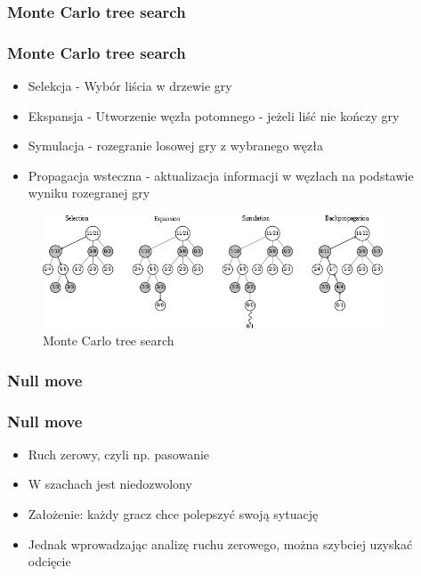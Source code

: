\documentclass[polish,envcountsect,10pt]{beamer}
\begin{document}
            \subsubsection{Monte Carlo tree search}
                \begin{frame}
                    \frametitle{Monte Carlo tree search}
                    \begin{itemize}
                        \item<1-> Selekcja - Wybór liścia w drzewie gry
                        \item<2-> Ekspansja - Utworzenie węzła potomnego - jeżeli liść nie kończy gry
                        \item<3-> Symulacja - rozegranie losowej gry z wybranego węzła
                        \item<4-> Propagacja wsteczna - aktualizacja informacji w węzłach na podstawie wyniku rozegranej gry                         
                    \end{itemize}
                    
                    \begin{figure}[H]
                        \centering
                        \includegraphics[width=0.9\textwidth]{images/mcts}
                        \caption{Monte Carlo tree search}
                    \end{figure}
                    
                \end{frame}
            \subsubsection{Null move}
            \begin{frame}
                \frametitle{Null move}
                \begin{itemize}
                    \item<1-> Ruch zerowy, czyli np. pasowanie
                    \item<2-> W szachach jest niedozwolony
                    \item<3-> Założenie: każdy gracz chce polepszyć swoją sytuację
                    \item<4-> Jednak wprowadzając analizę ruchu zerowego, można szybciej uzyskać odcięcie
                \end{itemize}
            \end{frame}
\end{document}
